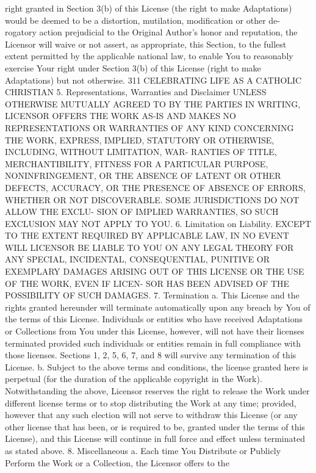 \documentclass[oneside]{book}
\begin{document}
right granted in Section 3(b) of this License (the right to make Adaptations)
would be deemed to be a distortion, mutilation, modification or other de-
rogatory action prejudicial to the Original Author's honor and reputation, the
Licensor will waive or not assert, as appropriate, this Section, to the fullest
extent permitted by the applicable national law, to enable You to reasonably
exercise Your right under Section 3(b) of this License (right to make
Adaptations) but not otherwise.  311 CELEBRATING LIFE AS A CATHOLIC CHRISTIAN
5. Representations, Warranties and Disclaimer UNLESS OTHERWISE MUTUALLY AGREED
TO BY THE PARTIES IN WRITING, LICENSOR OFFERS THE WORK AS-IS AND MAKES NO
REPRESENTATIONS OR WARRANTIES OF ANY KIND CONCERNING THE WORK, EXPRESS, IMPLIED,
STATUTORY OR OTHERWISE, INCLUDING, WITHOUT LIMITATION, WAR- RANTIES OF TITLE,
MERCHANTIBILITY, FITNESS FOR A PARTICULAR PURPOSE, NONINFRINGEMENT, OR THE
ABSENCE OF LATENT OR OTHER DEFECTS, ACCURACY, OR THE PRESENCE OF ABSENCE OF
ERRORS, WHETHER OR NOT DISCOVERABLE. SOME JURISDICTIONS DO NOT ALLOW THE EXCLU-
SION OF IMPLIED WARRANTIES, SO SUCH EXCLUSION MAY NOT APPLY TO YOU.
6. Limitation on Liability.  EXCEPT TO THE EXTENT REQUIRED BY APPLICABLE LAW, IN
NO EVENT WILL LICENSOR BE LIABLE TO YOU ON ANY LEGAL THEORY FOR ANY SPECIAL,
INCIDENTAL, CONSEQUENTIAL, PUNITIVE OR EXEMPLARY DAMAGES ARISING OUT OF THIS
LICENSE OR THE USE OF THE WORK, EVEN IF LICEN- SOR HAS BEEN ADVISED OF THE
POSSIBILITY OF SUCH DAMAGES.  7. Termination a. This License and the rights
granted hereunder will terminate automatically upon any breach by You of the
terms of this License. Individuals or entities who have received Adaptations or
Collections from You under this License, however, will not have their licenses
terminated provided such individuals or entities remain in full compliance with
those licenses. Sections 1, 2, 5, 6, 7, and 8 will survive any termination of
this License.  b. Subject to the above terms and conditions, the license granted
here is perpetual (for the duration of the applicable copyright in the
Work). Notwithstanding the above, Licensor reserves the right to release the
Work under different license terms or to stop distributing the Work at any time;
provided, however that any such election will not serve to withdraw this License
(or any other license that has been, or is required to be, granted under the
terms of this License), and this License will continue in full force and effect
unless terminated as stated above.  8. Miscellaneous a. Each time You Distribute
or Publicly Perform the Work or a Collection, the Licensor offers to the
\end{document}
